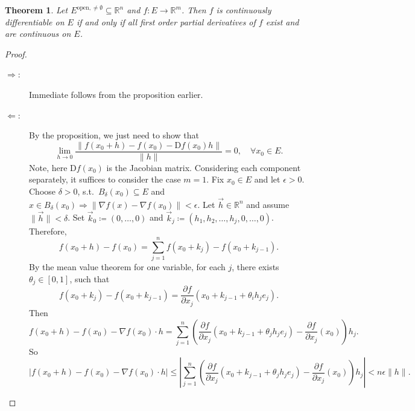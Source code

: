 \documentclass[12pt]{article}
\theoremstyle{plain}
\newtheorem{thm}{Theorem}
\theoremstyle{definition}
\begin{document}
\begin{thm}
    Let $E^{\text{open}, \neq\emptyset}\subseteq\mathbb{R}^n$ and $f: E\rightarrow\mathbb{R}^m$.
    Then $f$ is continuously differentiable on $E$ if and  only if all first order partial derivatives of $f$ exist and are continuous on $E$.
\end{thm}
\begin{proof}
    \begin{description}
        \item[$\Rightarrow$:]
            Immediate follows from the proposition earlier.
        \item[$\Leftarrow$:]
            By the proposition, we just need to show that
            \[
                \lim_{h\rightarrow 0}\frac{\|f(x_0+h) - f(x_0) - \mathrm{D}f(x_0)h\|}{\|h\|} = 0, \quad \forall x_0\in E.
            \]
            Note, here $\mathrm{D}f(x_0)$ is the Jacobian matrix.
            Considering each component separately, it suffices to consider the case $m=1$.
            Fix $x_0\in E$ and let $\epsilon > 0$.
            Choose $\delta > 0$, s.t.\ $B_\delta(x_0) \subseteq E$ and $x\in B_{\delta}(x_0) \Rightarrow \|\nabla f(x) - \nabla f(x_0)\|<\epsilon$.
            Let $\vec{h}\in\mathbb{R}^n$ and assume $\|\vec{h}\|<\delta$.
            Set $\vec{k}_0\coloneqq (0,\ldots,0)$ and $\vec{k}_j\coloneqq (h_1, h_2, \ldots, h_j, 0, \ldots, 0)$.
            Therefore, 
            \[
                f(x_0+h) - f(x_0) = \sum_{j=1}^n f(x_0 + k_j) - f(x_0 + k_{j-1}).
            \]
            By the mean value theorem for one variable, for each $j$, there exists $\theta_j\in[0,1]$, such that
            \[
                f(x_0 + k_j) - f(x_0 + k_{j-1}) = \frac{\partial f}{\partial x_j} (x_0 + k_{j-1} + \theta_i h_j e_j).
            \]
            Then
            \[
                f(x_0+h) - f(x_0) - \nabla f(x_0)\cdot h
                =\sum_{j=1}^n \left(\frac{\partial f}{\partial x_j} (x_0+k_{j-1} + \theta_j h_j e_j)  - \frac{\partial f}{\partial
                x_j}(x_0)\right) h_j.
            \]
            So
            \[
                |f(x_0+h) - f(x_0) - \nabla f(x_0)\cdot h|
                \leq \left|\sum_{j=1}^n \left(\frac{\partial f}{\partial x_j} (x_0+k_{j-1} + \theta_j h_j e_j)  - \frac{\partial f}{\partial
                x_j}(x_0)\right) h_j\right| < n \epsilon \|h\|.
            \]
    \end{description}
\end{proof}
\end{document}
